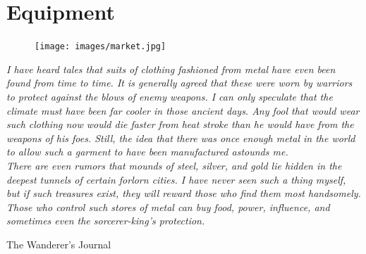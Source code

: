 \chapter{Equipment}\label{chap:equipment}
\begin{figure}[!htb]
\centering
\texttt{[image: images/market.jpg]}
\end{figure}

\epigraph{\textit{
    I have heard tales that suits of clothing fashioned from metal have even been
    found from time to time. It is generally agreed that these were worn by
    warriors to protect against the blows of enemy weapons. I can only speculate
    that the climate must have been far cooler in those ancient days. Any fool
    that would wear such clothing now would die faster from heat stroke than he
    would have from the weapons of his foes. Still, the idea that there was once
    enough metal in the world to allow such a garment to have been manufactured
    astounds me.\\
    There are even rumors that mounds of steel, silver, and gold lie hidden in
    the deepest tunnels of certain forlorn cities. I have never seen such a thing
    myself, but if such treasures exist, they will reward those who find them most
    handsomely. Those who control such stores of metal can buy food, power,
    influence, and sometimes even the sorcerer-king’s protection.
} }{
    The Wanderer’s Journal
}

